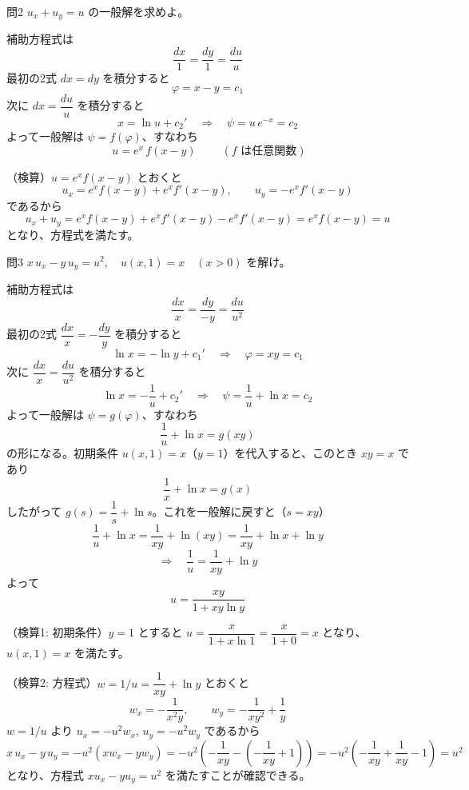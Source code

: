 \documentclass[a4paper,11pt]{article}
\begin{document}
\clearpage
\begin{mondaiboxS}{問2}
$u_{x} + u_{y} = u$ の一般解を求めよ。
\end{mondaiboxS}
\kaitou
補助方程式は
\[
\frac{dx}{1} = \frac{dy}{1} = \frac{du}{u}
\]
最初の2式 $dx = dy$ を積分すると
\[
\varphi = x - y = c_{1}
\]
次に $dx = \dfrac{du}{u}$ を積分すると
\[
x = \ln u + c_{2}' \quad\Longrightarrow\quad \psi = u\,e^{-x} = c_{2}
\]
よって一般解は $\psi = f(\varphi)$、すなわち
\[
\boxed{\; u = e^{x}\,f(x - y) \;}
\qquad (f \text{ は任意関数})
\]

（検算）$u = e^{x} f(x-y)$ とおくと
\[
u_{x} = e^{x} f(x-y) + e^{x} f'(x-y), \qquad
u_{y} = -e^{x} f'(x-y)
\]
であるから
\[
u_{x} + u_{y} = e^{x} f(x-y) + e^{x} f'(x-y) - e^{x} f'(x-y) = e^{x} f(x-y) = u
\]
となり、方程式を満たす。

\clearpage
\begin{mondaiboxS}{問3}
$x\,u_{x} - y\,u_{y} = u^{2}, \quad u(x,1) = x \quad (x > 0)$ を解け。
\end{mondaiboxS}
\kaitou
補助方程式は
\[
\frac{dx}{x} = \frac{dy}{-y} = \frac{du}{u^{2}}
\]
最初の2式 $\dfrac{dx}{x} = -\dfrac{dy}{y}$ を積分すると
\[
\ln x = -\ln y + c_{1}' \quad\Longrightarrow\quad \varphi = xy = c_{1}
\]
次に $\dfrac{dx}{x} = \dfrac{du}{u^{2}}$ を積分すると
\[
\ln x = -\frac{1}{u} + c_{2}' \quad\Longrightarrow\quad \psi = \frac{1}{u} + \ln x = c_{2}
\]
よって一般解は $\psi = g(\varphi)$、すなわち
\[
\frac{1}{u} + \ln x = g(xy)
\]
の形になる。初期条件 $u(x,1) = x$（$y=1$）を代入すると、このとき $xy = x$ であり
\[
\frac{1}{x} + \ln x = g(x)
\]
したがって $g(s) = \dfrac{1}{s} + \ln s$。これを一般解に戻すと（$s = xy$）
\[
\frac{1}{u} + \ln x = \frac{1}{xy} + \ln(xy) = \frac{1}{xy} + \ln x + \ln y
\]
\[
\Longrightarrow \quad \frac{1}{u} = \frac{1}{xy} + \ln y
\]
よって
\[
\boxed{\; u = \frac{xy}{1 + xy\ln y} \;}
\]

（検算1: 初期条件）$y=1$ とすると $u = \dfrac{x}{1 + x\ln 1} = \dfrac{x}{1+0} = x$ となり、$u(x,1)=x$ を満たす。

（検算2: 方程式）$w = 1/u = \dfrac{1}{xy} + \ln y$ とおくと
\[
w_{x} = -\frac{1}{x^{2}y}, \qquad w_{y} = -\frac{1}{xy^{2}} + \frac{1}{y}
\]
$w = 1/u$ より $u_{x} = -u^{2} w_{x}$, $u_{y} = -u^{2} w_{y}$ であるから
\[
x\,u_{x} - y\,u_{y}
= -u^{2}\left(x w_{x} - y w_{y}\right)
= -u^{2}\left(-\frac{1}{xy} - \left(-\frac{1}{xy} + 1\right)\right)
= -u^{2}\left(-\frac{1}{xy} + \frac{1}{xy} - 1\right)
= u^{2}
\]
となり、方程式 $x u_{x} - y u_{y} = u^{2}$ を満たすことが確認できる。
\end{document}
